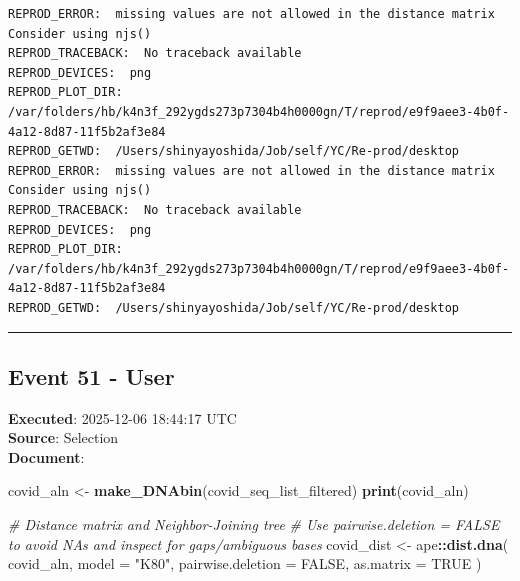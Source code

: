 \documentclass[
  11pt,
]{article}
\newenvironment{Shaded}{\begin{snugshade}}{\end{snugshade}}
\newcommand{\AttributeTok}[1]{\textcolor[rgb]{0.13,0.29,0.53}{#1}}
\newcommand{\CommentTok}[1]{\textcolor[rgb]{0.56,0.35,0.01}{\textit{#1}}}
\newcommand{\ConstantTok}[1]{\textcolor[rgb]{0.56,0.35,0.01}{#1}}
\newcommand{\FunctionTok}[1]{\textcolor[rgb]{0.13,0.29,0.53}{\textbf{#1}}}
\newcommand{\NormalTok}[1]{#1}
\newcommand{\OtherTok}[1]{\textcolor[rgb]{0.56,0.35,0.01}{#1}}
\newcommand{\SpecialCharTok}[1]{\textcolor[rgb]{0.81,0.36,0.00}{\textbf{#1}}}
\newcommand{\StringTok}[1]{\textcolor[rgb]{0.31,0.60,0.02}{#1}}
\newenvironment{rpoutput}{\vspace{0.5em}\begin{snugshade}}{\end{snugshade}}
\begin{document}
\begin{rpoutput}

\begin{verbatim}
REPROD_ERROR:  missing values are not allowed in the distance matrix
Consider using njs() 
REPROD_TRACEBACK:  No traceback available  
REPROD_DEVICES:  png 
REPROD_PLOT_DIR:  /var/folders/hb/k4n3f_292ygds273p7304b4h0000gn/T/reprod/e9f9aee3-4b0f-4a12-8d87-11f5b2af3e84 
REPROD_GETWD:  /Users/shinyayoshida/Job/self/YC/Re-prod/desktop 
REPROD_ERROR:  missing values are not allowed in the distance matrix
Consider using njs() 
REPROD_TRACEBACK:  No traceback available  
REPROD_DEVICES:  png 
REPROD_PLOT_DIR:  /var/folders/hb/k4n3f_292ygds273p7304b4h0000gn/T/reprod/e9f9aee3-4b0f-4a12-8d87-11f5b2af3e84 
REPROD_GETWD:  /Users/shinyayoshida/Job/self/YC/Re-prod/desktop 
\end{verbatim}

\end{rpoutput}

\begin{center}\rule{0.5\linewidth}{0.5pt}\end{center}

\subsection{Event 51 - User}\label{event-51---user}

\textbf{Executed}: 2025-12-06 18:44:17 UTC\\
\textbf{Source}: Selection\\
\textbf{Document}:

\begin{Shaded}
\begin{Highlighting}[]
\NormalTok{covid\_aln }\OtherTok{\textless{}{-}} \FunctionTok{make\_DNAbin}\NormalTok{(covid\_seq\_list\_filtered)}
\FunctionTok{print}\NormalTok{(covid\_aln)}

\CommentTok{\# Distance matrix and Neighbor{-}Joining tree}
\CommentTok{\# Use pairwise.deletion = FALSE to avoid NAs and inspect for gaps/ambiguous bases}
\NormalTok{covid\_dist }\OtherTok{\textless{}{-}}\NormalTok{ ape}\SpecialCharTok{::}\FunctionTok{dist.dna}\NormalTok{(}
\NormalTok{  covid\_aln,}
  \AttributeTok{model =} \StringTok{"K80"}\NormalTok{,}
  \AttributeTok{pairwise.deletion =} \ConstantTok{FALSE}\NormalTok{,}
  \AttributeTok{as.matrix =} \ConstantTok{TRUE}
\NormalTok{)}
\end{Highlighting}
\end{Shaded}
\end{document}
